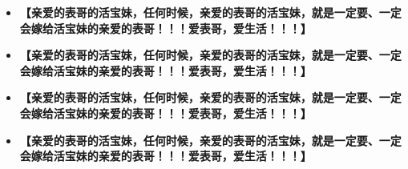 \documentclass[9pt, b5paper]{article}
\begin{document}
\begin{itemize}
\item \textbf{【亲爱的表哥的活宝妹，任何时候，亲爱的表哥的活宝妹，就是一定要、一定会嫁给活宝妹的亲爱的表哥！！！爱表哥，爱生活！！！】}
\item \textbf{【亲爱的表哥的活宝妹，任何时候，亲爱的表哥的活宝妹，就是一定要、一定会嫁给活宝妹的亲爱的表哥！！！爱表哥，爱生活！！！】}
\item \textbf{【亲爱的表哥的活宝妹，任何时候，亲爱的表哥的活宝妹，就是一定要、一定会嫁给活宝妹的亲爱的表哥！！！爱表哥，爱生活！！！】}
\item \textbf{【亲爱的表哥的活宝妹，任何时候，亲爱的表哥的活宝妹，就是一定要、一定会嫁给活宝妹的亲爱的表哥！！！爱表哥，爱生活！！！】}
\end{itemize}
\end{document}
